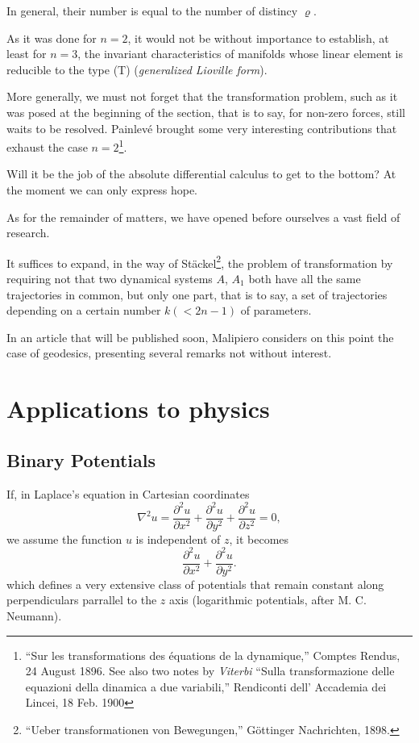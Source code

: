 \documentclass{book}
\begin{document}
In general, their number is equal to the number of distincy $\varrho$. 

As it was done for $n=2$, it would not be without importance to establish, at least for $n=3$, the invariant characteristics of manifolds whose linear element is reducible to the type (T) (\emph{generalized Lioville form}). 

More generally, we must not forget that the transformation problem, such as it was posed at the beginning of the section, that is to say, for non-zero forces, still waits to be resolved. Painlev\'e brought some very interesting contributions that exhaust the case $n=2$\footnote{``Sur les transformations des \'equations de la dynamique,'' Comptes Rendus, 24 August 1896. See also two notes by \emph{Viterbi} ``Sulla transformazione delle equazioni della dinamica a due variabili,'' Rendiconti dell' Accademia dei Lincei, 18 Feb. 1900}.

Will it be the job of the absolute differential calculus to get to the bottom? At the moment we can only express hope.

As for the remainder of matters, we have opened before ourselves a vast field of research. 

It suffices to expand, in the way of St\"ackel\footnote{``Ueber transformationen von Bewegungen,'' G\"ottinger Nachrichten, 1898.}, the problem of transformation by requiring not that two dynamical systems $A$, $A_1$ both have all the same trajectories in common, but only one part, that is to say, a set of trajectories depending on a certain number $k(<2n-1)$ of parameters. 

In an article that will be published soon, Malipiero considers on this point the case of geodesics, presenting several remarks not without interest.

\chapter{Applications to physics}

\section{Binary Potentials}

If, in Laplace's equation in Cartesian coordinates
$$\nabla^2u=\frac{\partial^2u}{\partial x^2}+\frac{\partial^2u}{\partial y^2}+\frac{\partial^2u}{\partial z^2}=0,$$
we assume the function $u$ is independent of $z$, it becomes
$$\frac{\partial^2u}{\partial x^2}+\frac{\partial^2u}{\partial y^2}.$$
which defines a very extensive class of potentials that remain constant along perpendiculars parrallel to the $z$ axis (logarithmic potentials, after M. C. Neumann).
\end{document}
